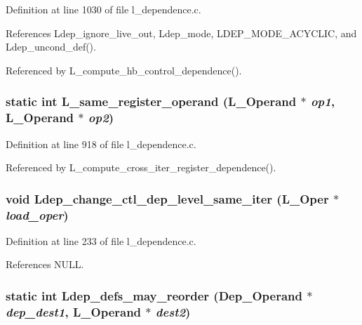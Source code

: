 Definition at line 1030 of file l\_\-dependence.c.

References Ldep\_\-ignore\_\-live\_\-out, Ldep\_\-mode, LDEP\_\-MODE\_\-ACYCLIC, and Ldep\_\-uncond\_\-def().

Referenced by L\_\-compute\_\-hb\_\-control\_\-dependence().
\subsubsection{\setlength{\rightskip}{0pt plus 5cm}static int L\_\-same\_\-register\_\-operand (L\_\-Operand $\ast$ {\em op1}, L\_\-Operand $\ast$ {\em op2})\hspace{0.3cm}{\tt  [static]}}\label{l__dependence_8c_79934227948b374b0bc8390f3d43e44a}




Definition at line 918 of file l\_\-dependence.c.

Referenced by L\_\-compute\_\-cross\_\-iter\_\-register\_\-dependence().
\subsubsection{\setlength{\rightskip}{0pt plus 5cm}void Ldep\_\-change\_\-ctl\_\-dep\_\-level\_\-same\_\-iter (L\_\-Oper $\ast$ {\em load\_\-oper})}\label{l__dependence_8c_8668b200bd600d31de9483dcfdc65fd2}




Definition at line 233 of file l\_\-dependence.c.

References NULL.
\subsubsection{\setlength{\rightskip}{0pt plus 5cm}static int Ldep\_\-defs\_\-may\_\-reorder (\bf{Dep\_\-Operand} $\ast$ {\em dep\_\-dest1}, L\_\-Operand $\ast$ {\em dest2})\hspace{0.3cm}{\tt  [static]}}\label{l__dependence_8c_682c50c8c07e0aec9286565007237ca6}




